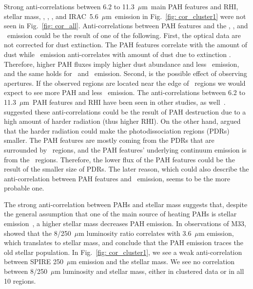         Strong anti-correlations between 6.2 to 11.3~$\mu$m~main PAH features and RHI, stellar mass, \halpha, \sii, \oiii, and IRAC~5.6~$\mu$m~emission in Fig.~\ref{fig: cor_cluster1} were not seen in Fig.~\ref{fig: cor_all}.
        Anti-correlations between PAH features and the \halpha, \sii, and \oiii~emission could be the result of one of the following. 
        First, the optical data are not corrected for dust extinction.
        The PAH features correlate with the amount of dust while \halpha~emission anti-correlates with amount of dust due to extinction \citep{Calzetti94}.
        Therefore, higher PAH fluxes imply higher dust abundance and less \halpha~emission, and the same holds for \sii~and \oiii~emission.
        Second, is the possible effect of observing apertures.
        If the observed regions are located near the edge of \hii~regions we would expect to see more PAH and less \halpha~emission. %
        The anti-correlations between 6.2 to 11.3~$\mu$m~PAH features and RHI have been seen in other studies, as well~\citep[e.g.][]{Dim15, Gordon08, Wu06}.
        \cite{Wu06} suggested these anti-correlations could be the result of PAH destruction due to a high amount of harder radiation (thus higher RHI).
        On the other hand, \cite{Gordon08} argued that the harder radiation could make the photodissociation regions (PDRs) smaller.
        The PAH features are mostly coming from the PDRs that are surrounded by \hii~regions, and the PAH features' underlying continuum emission is from the \hii~regions.
        Therefore, the lower flux of the PAH features could be the result of the smaller size of PDRs.
        The later reason, which could also describe the anti-correlation between PAH features and \halpha~emission, seems to be the more probable one. 
        
        The strong anti-correlation between PAHs and stellar mass suggests that, despite the general assumption that one of the main source of heating PAHs is stellar emission~\citep[e.g][]{Jones15,Lu14,Calapa14,Bendo08,Haas02}, a higher stellar mass decreases PAH emission.
        In observations of M33,~\cite{Calapa14} showed that the 8/250~$\mu$m luminosity ratio correlates with 3.6~$\mu$m emission, which translates to stellar mass, and conclude that the PAH emission traces the old stellar population.
        In Fig.~\ref{fig: cor_cluster1}, we see a weak anti-correlation between SPIRE 250~$\mu$m emission and the stellar mass.
        We see no correlation between 8/250~$\mu$m luminosity and stellar mass, either in clustered data or in all 10 regions.
        
